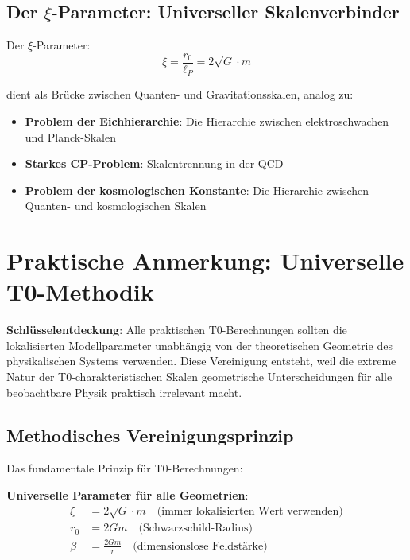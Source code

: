 \documentclass[12pt,a4paper]{article}
\begin{document}
	\subsection{Der $\xi$-Parameter: Universeller Skalenverbinder}
	\label{subsec:xi_universal}
	\label{sec:xi_derivation}
	
	Der $\xi$-Parameter:
	\begin{equation}
		\xi = \frac{r_0}{\ell_P} = 2\sqrt{G} \cdot m
	\end{equation}
	
	dient als Brücke zwischen Quanten- und Gravitationsskalen, analog zu:
	\begin{itemize}
		\item \textbf{Problem der Eichhierarchie}: Die Hierarchie zwischen elektroschwachen und Planck-Skalen \citep{weinberg1995,susskind1979}
		\item \textbf{Starkes CP-Problem}: Skalentrennung in der QCD \citep{peccei1977,weinberg1978}
		\item \textbf{Problem der kosmologischen Konstante}: Die Hierarchie zwischen Quanten- und kosmologischen Skalen \citep{weinberg1989,carroll2001}
	\end{itemize}
	
	\section{Praktische Anmerkung: Universelle T0-Methodik}
	\label{sec:practical_methodology}
	
	\begin{tcolorbox}[colback=green!5!white,colframe=green!75!black,title=Universelle T0-Berechnungsmethode]
		\textbf{Schlüsselentdeckung}: Alle praktischen T0-Berechnungen sollten die lokalisierten Modellparameter unabhängig von der theoretischen Geometrie des physikalischen Systems verwenden. Diese Vereinigung entsteht, weil die extreme Natur der T0-charakteristischen Skalen geometrische Unterscheidungen für alle beobachtbare Physik praktisch irrelevant macht.
	\end{tcolorbox}
	
	\subsection{Methodisches Vereinigungsprinzip}
	\label{subsec:methodological_unification}
	
	Das fundamentale Prinzip für T0-Berechnungen:
	
	\textbf{Universelle Parameter für alle Geometrien}:
	\begin{align}
		\xi &= 2\sqrt{G} \cdot m \quad \text{(immer lokalisierten Wert verwenden)} \\
		r_0 &= 2Gm \quad \text{(Schwarzschild-Radius)} \\
		\beta &= \frac{2Gm}{r} \quad \text{(dimensionslose Feldstärke)}
	\end{align}
	
\end{document}
